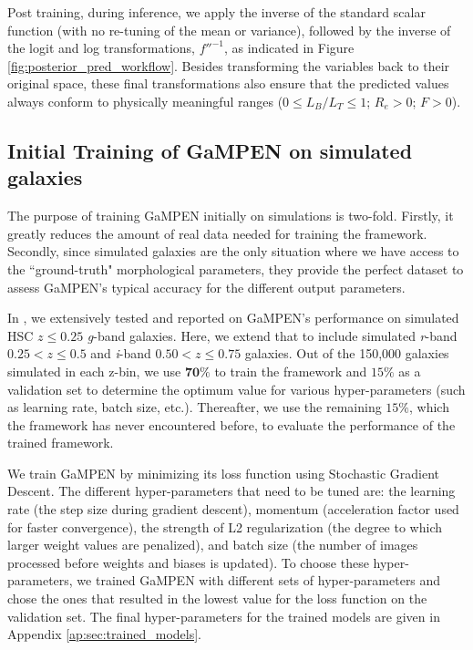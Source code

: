 \documentclass[linenumbers,twocolumn,twocolappendix]{aastex631}
\newcommand\gampen{GaMPEN}
\newcommand\gb{\textit{g}}
\newcommand\rb{\textit{r}}
\newcommand\ib{\textit{i}}
\begin{document}
\begin{CJK*}{UTF8}{gbsn}
Post training, during inference, we apply the inverse of the standard scalar function (with no re-tuning of the mean or variance), followed by the inverse of the logit and log transformations, $f''^{-1}$, as indicated in Figure\,\ref{fig:posterior_pred_workflow}. Besides transforming the variables back to their original space, these final transformations also ensure that the predicted values always conform to physically meaningful ranges ($0 \leq L_B/L_T \leq 1$; $R_e > 0$; $F > 0$).


\subsection{Initial Training of \gampen{} on simulated galaxies} \label{sec:sim_training}
The purpose of training \gampen{} initially on simulations is two-fold. Firstly, it greatly reduces the amount of real data needed for training the framework. Secondly, since simulated galaxies are the only situation where we have access to the ``ground-truth" morphological parameters, they provide the perfect dataset to assess \gampen{}'s typical accuracy for the different output parameters. 

In \citet{gampen_software_paper}, we extensively tested and reported on \gampen{}'s performance on simulated HSC $z \leq 0.25$ \gb{}-band galaxies. Here, we extend that to include simulated \rb{}-band $0.25 < z \leq 0.5$ and \ib{}-band $0.50 < z \leq 0.75$  galaxies. Out of the 150,000 galaxies simulated in each z-bin, we use $\mathbf{70\%}$ to train the framework and $15\%$ as a validation set to determine the optimum value for various hyper-parameters (such as learning rate, batch size, etc.). Thereafter, we use the remaining $15\%$, which the framework has never encountered before, to evaluate the performance of the trained framework. 

We train \gampen{} by minimizing its loss function using Stochastic Gradient Descent. The different hyper-parameters that need to be tuned are: the learning rate (the step size during gradient descent), momentum (acceleration factor used for faster convergence), the strength of L2 regularization (the degree to which larger weight values are penalized), and batch size (the number of images processed before weights and biases is updated). To choose these hyper-parameters, we trained \gampen{} with different sets of hyper-parameters and chose the ones that resulted in the lowest value for the loss function on the validation set. The final %
hyper-parameters for the trained models are given in Appendix \ref{ap:sec:trained_models}.


\end{CJK*}
\end{document}
